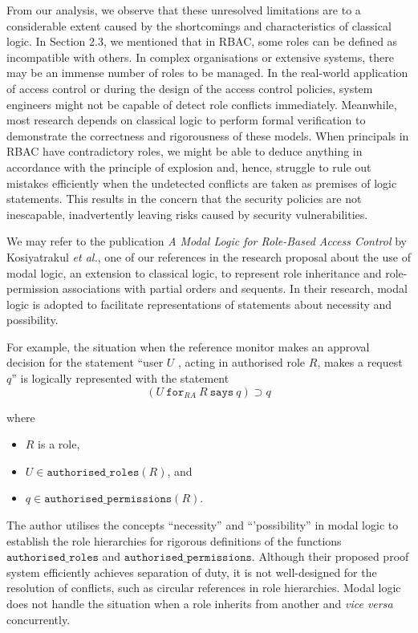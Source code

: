 \documentclass{article}
\begin{document}
From our analysis, we observe that these unresolved limitations are to a considerable extent caused by the shortcomings and characteristics of classical logic. In Section 2.3, we mentioned that in RBAC, some roles can be defined as incompatible with others. In complex organisations or extensive systems, there may be an immense number of roles to be managed. In the real-world application of access control or during the design of the access control policies, system engineers might not be capable of detect role conflicts immediately. Meanwhile, most research depends on classical logic to perform formal verification to demonstrate the correctness and rigorousness of these models. When principals in RBAC have contradictory roles, we might be able to deduce anything in accordance with the principle of explosion and, hence, struggle to rule out mistakes efficiently when the undetected conflicts are taken as premises of logic statements. This results in the concern that the security policies are not inescapable, inadvertently leaving risks caused by security vulnerabilities.\cite{rbac-vs-abac}

We may refer to the publication \textit{A Modal Logic for Role-Based Access Control} by Kosiyatrakul \textit{et al.}, one of our references in the research proposal about the use of modal logic, an extension to classical logic, to represent role inheritance and role-permission associations with partial orders and sequents. In their research, modal logic is adopted to facilitate representations of statements about necessity and possibility.\cite{modal-logic}

For example, the situation when the reference monitor makes an approval decision for the statement ``user $U$ , acting in authorised role $R$, makes a request $q$'' is logically represented with the statement
$$(U\ \texttt{for}_{RA}\ R\ \texttt{says}\ q) \supset q$$

where
\begin{itemize}
    \item $R$ is a role,
    \item $U \in \texttt{authorised\_roles}(R)$, and
    \item $q \in \texttt{authorised\_permissions}(R)$.
\end{itemize}

The author utilises the concepts ``necessity'' and ``'possibility'' in modal logic to establish the role hierarchies for rigorous definitions of the functions $\texttt{authorised\_roles}$ and $\texttt{authorised\_permissions}$. Although their proposed proof system efficiently achieves separation of duty, it is not well-designed for the resolution of conflicts, such as circular references in role hierarchies. Modal logic does not handle the situation when a role inherits from another and \textit{vice versa} concurrently.
\end{document}
